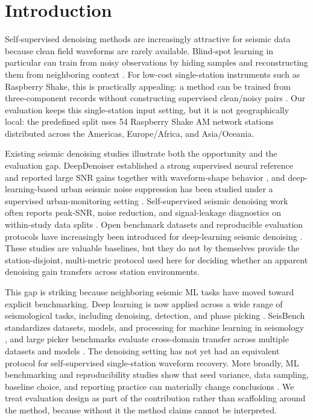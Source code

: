 \documentclass[review,12pt,authoryear]{elsarticle}
\begin{document}
\section{Introduction}
Self-supervised denoising methods are increasingly attractive for seismic data because clean field waveforms are rarely available. Blind-spot learning in particular can train from noisy observations by hiding samples and reconstructing them from neighboring context \citep{birnie2021,birnie2022,krull2019}. For low-cost single-station instruments such as Raspberry Shake, this is practically appealing: a method can be trained from three-component records without constructing supervised clean/noisy pairs \citep{anthony2019,raspberryshake2016}. Our evaluation keeps this single-station input setting, but it is not geographically local: the predefined split uses 54 Raspberry Shake AM network stations distributed across the Americas, Europe/Africa, and Asia/Oceania.

Existing seismic denoising studies illustrate both the opportunity and the evaluation gap. DeepDenoiser established a strong supervised neural reference and reported large SNR gains together with waveform-shape behavior \citep{zhu2019}, and deep-learning-based urban seismic noise suppression has been studied under a supervised urban-monitoring setting \citep{yang2022}. Self-supervised seismic denoising work often reports peak-SNR, noise reduction, and signal-leakage diagnostics on within-study data splits \citep{birnie2021,birnie2022}. Open benchmark datasets and reproducible evaluation protocols have increasingly been introduced for deep-learning seismic denoising \citep{barros2026}. These studies are valuable baselines, but they do not by themselves provide the station-disjoint, multi-metric protocol used here for deciding whether an apparent denoising gain transfers across station environments.

This gap is striking because neighboring seismic ML tasks have moved toward explicit benchmarking. Deep learning is now applied across a wide range of seismological tasks, including denoising, detection, and phase picking \citep{mousavi2022,zhu2019}. SeisBench standardizes datasets, models, and processing for machine learning in seismology \citep{woollam2022}, and large picker benchmarks evaluate cross-domain transfer across multiple datasets and models \citep{munchmeyer2022}. The denoising setting has not yet had an equivalent protocol for self-supervised single-station waveform recovery. More broadly, ML benchmarking and reproducibility studies show that seed variance, data sampling, baseline choice, and reporting practice can materially change conclusions \citep{bouthillier2021,dodge2020,henderson2018,lones2021,pineau2021}. We treat evaluation design as part of the contribution rather than scaffolding around the method, because without it the method claims cannot be interpreted.
\end{document}
